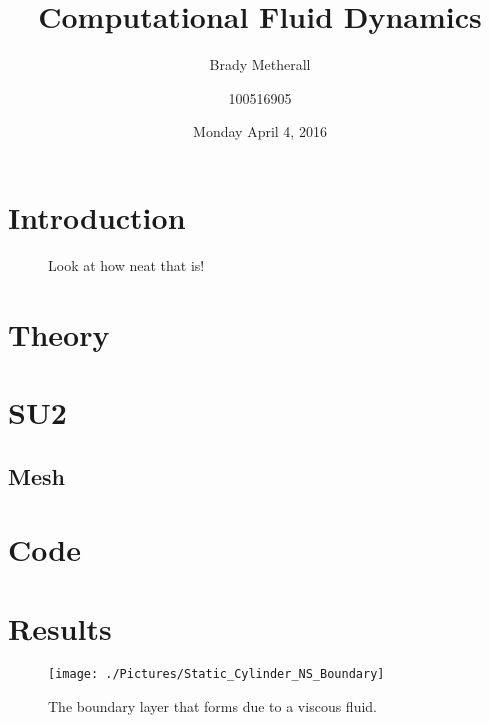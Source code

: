 \documentclass[10pt]{article}
\title{Computational Fluid Dynamics}
\author{Brady Metherall \and 100516905}
\date{Monday April 4, 2016}
\begin{document}
\maketitle
\setlength\parindent{0pt}
\lstset{language=myMMA}

\section{Introduction}

\begin{wrapfigure}{r}{0.5\textwidth}
\label{airfoilanimation}
\centering
{}
\caption{Look at how neat that is!}
\end{wrapfigure}

\lipsum[1-4]

\section{Theory}

\section{SU2}

\subsection{Mesh}

\section{Code}

\begin{figure}[p]

\end{figure}

\section{Results}

\begin{figure}[ht]
\centering
\label{boundary}
\texttt{[image: ./Pictures/Static\_Cylinder\_NS\_Boundary]}
\caption{The boundary layer that forms due to a viscous fluid.}
\end{figure}
\end{document}
